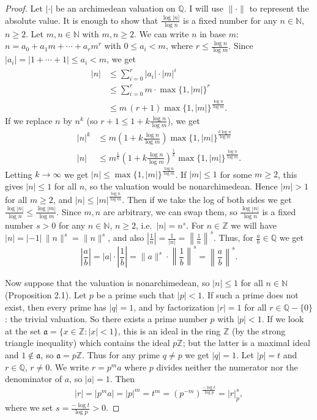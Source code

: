 \documentclass[11pt]{article}
\begin{document}
\begin{proof}
Let $|\cdot|$ be an archimedean valuation on $\mathbb{Q}$. I will use $\|\cdot\|$ to represent the absolute value. It is enough to show that $\frac{\log |n|}{\log n}$ is a fixed number for any $n \in \mathbb{N}$, $n \geq 2$. Let $m, n \in \mathbb{N}$ with $m, n \geq 2$. We can write $n$ in base $m$: $n = a_0 + a_1 m + \cdots + a_r m^r$ with $0 \leq a_i < m$, where $r \leq \frac{\log n}{\log m}$. Since $|a_i| = |1 + \cdots + 1| \leq a_i < m$, we get
\[
\begin{aligned}
|n| &\leq \sum_{i=0}^r |a_i| \cdot |m|^i \\
&\leq \sum_{i=0}^r m \cdot \max\{1, |m|\}^r \\
&\leq m\, (r + 1) \max\{1, |m|\}^{\frac{\log n}{\log m}} .
\end{aligned}
\]
If we replace $n$ by $n^k$ (so $r + 1 \leq 1 + k\frac{\log n}{\log m}$), we get
\[
\begin{aligned}
|n|^k &\leq m \left(1 + k\frac{\log n}{\log m}\right) \max\{1, |m|\}^{\frac{k \log n}{\log m}} \\
|n| &\leq m^{\frac1k} \left(1 + k\frac{\log n}{\log m}\right)^{\frac1k} \max\{1, |m|\}^{\frac{\log n}{\log m}} .
\end{aligned}
\]
Letting $k \rightarrow \infty$ we get $|n| \leq \max\{1, |m|\}^{\frac{\log n}{\log m}}$. If $|m| \leq 1$ for some $m \geq 2$, this gives $|n| \leq 1$ for all $n$, so the valuation would be nonarchimedean. Hence $|m| > 1$ for all $m \geq 2$, and $|n| \leq |m|^{\frac{\log n}{\log m}}$. Then if we take the log of both sides we get $\frac{\log |n|}{\log n} \leq \frac{\log |m|}{\log m}$. Since $m, n$ are arbitrary, we can swap them, so $\frac{\log |n|}{\log n}$ is a fixed number $s > 0$ for any $n \in \mathbb{N}$, $n \geq 2$, i.e.\ $|n| = n^s$. For $n \in \mathbb{Z}$ we will have $|n| = |{-1}|\,\|n\|^s = \|n\|^s$, and also $\left|\frac{1}{n}\right| = \frac{1}{|n|} = \left\|\frac1n\right\|^s$. Thus, for $\frac{a}{b} \in \mathbb{Q}$ we get
\[
\left| \frac{a}{b} \right| = |a| \cdot \left| \frac{1}{b} \right| = \|a\|^s \cdot \left\| \frac{1}{b} \right\|^s = \left\| \frac{a}{b} \right\|^s .
\]

Now suppose that the valuation is nonarchimedean, so $|n| \leq 1$ for all $n \in \mathbb{N}$ (Proposition 2.1). Let $p$ be a prime such that $|p| < 1$. If such a prime does not exist, then every prime has $|q| = 1$, and by factorization $|r| = 1$ for all $r \in \mathbb{Q} - \{0\}$: the trivial valuation. So there exists a prime number $p$ with $|p| < 1$. If we look at the set $\mathfrak{a} = \{x \in \mathbb{Z} : |x| < 1\}$, this is an ideal in the ring $\mathbb{Z}$ (by the strong triangle inequality) which contains the ideal $p\mathbb{Z}$; but the latter is a maximal ideal and $1 \notin \mathfrak{a}$, so $\mathfrak{a} = p\mathbb{Z}$. Thus for any prime $q \neq p$ we get $|q| = 1$. Let $|p| = t$ and $r \in \mathbb{Q}$, $r \neq 0$. We write $r = p^m a$ where $p$ divides neither the numerator nor the denominator of $a$, so $|a| = 1$. Then
\[
|r| = |p^m a| = |p|^m = t^m = (p^{-m})^{\frac{-\log t}{\log p}} = |r|_p^s,
\]
where we set $s = \frac{-\log t}{\log p} > 0$.
\end{proof}
\end{document}
